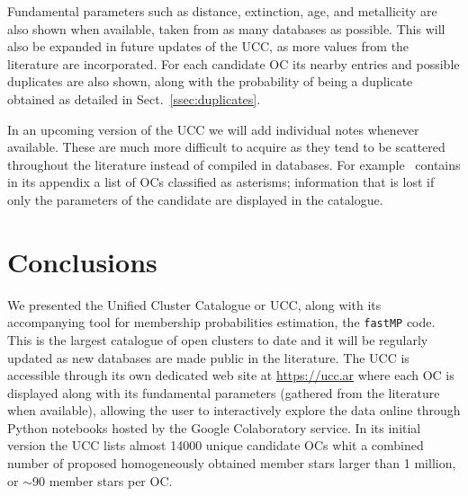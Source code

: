 \documentclass[fleqn,usenatbib]{mnras}
\begin{document}
Fundamental parameters such as distance, extinction, age, and metallicity are
also shown when available, taken from as many databases as possible. This will
also be expanded in future updates of the UCC, as more values from the
literature are incorporated. For each candidate OC its nearby entries and
possible duplicates are also shown, along with the probability of being a
duplicate obtained as detailed in Sect.~\ref{ssec:duplicates}.

In an upcoming version of the UCC we will add individual notes whenever
available. These are much more difficult to acquire as they tend
to be scattered throughout the literature instead of compiled in databases.
For example~\cite{Cantat-Anders_2020} contains in its appendix a list of OCs
classified as asterisms; information that is lost if only the parameters of
the candidate are displayed in the catalogue.










\section{Conclusions}
\label{sec:conclusions}

We presented the Unified Cluster Catalogue or UCC, along with its accompanying
tool for membership probabilities estimation, the \texttt{fastMP} code. This is
the largest catalogue of open clusters to date and it will be regularly updated
as new databases are made public in the literature. The UCC is accessible
through its own dedicated web site at \url{https://ucc.ar} where each OC is
displayed along with its fundamental parameters (gathered from the literature
when available), allowing the user to interactively explore the data online
through Python notebooks hosted by the Google Colaboratory service. In its
initial version the UCC lists almost 14000 unique candidate OCs whit a combined
number of proposed homogeneously obtained member stars larger than 1 million,
or $\sim$90 member stars per OC.
\end{document}
